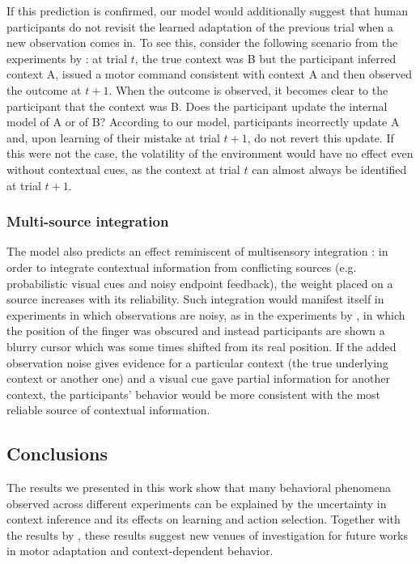 \documentclass[a4paper,doc,floatsintext,natbib]{apa6}%
\begin{document}
If this prediction is confirmed, our model would additionally suggest that human participants do not revisit the learned adaptation of the previous trial when a new observation comes in. To see this, consider the following scenario from the experiments by \cite{Herzfeld_memory_2014}: at trial $t$, the true context was B but the participant inferred context A, issued a motor command consistent with context A and then observed the outcome at $t + 1$. When the outcome is observed, it becomes clear to the participant that the context was B. Does the participant update the internal model of A or of B? According to our model, participants incorrectly update A and, upon learning of their mistake at trial $t+1$, do not revert this update. If this were not the case, the volatility of the environment would have no effect even without contextual cues, as the context at trial $t$ can almost always be identified at trial $t+1$.

\subsubsection{Multi-source integration}
The model also predicts an effect reminiscent of multisensory integration \citep{Ernst_Humans_2002}: in order to integrate contextual information from conflicting sources (e.g. probabilistic visual cues and noisy endpoint feedback), the weight placed on a source increases with its reliability. Such integration would manifest itself in experiments in which observations are noisy, as in the experiments by \cite{Kording_Bayesian_2004}, in which the position of the finger was obscured and instead participants are shown a blurry cursor which was some times shifted from its real position. If the added observation noise gives evidence for a particular context (the true underlying context or another one) and a visual cue gave partial information for another context, the participants' behavior would be more consistent with the most reliable source of contextual information.

\subsection{Conclusions}
The results we presented in this work show that many behavioral phenomena observed across different experiments can be explained by the uncertainty in context inference and its effects on learning and action selection. Together with the results by \cite{Heald_Contextual_2021}, these results suggest new venues of investigation for future works in motor adaptation and context-dependent behavior.
\end{document}
